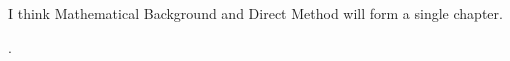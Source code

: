 {\color{red} I think Mathematical Background and Direct Method will form a single chapter. }


\cite{dacorogna}.